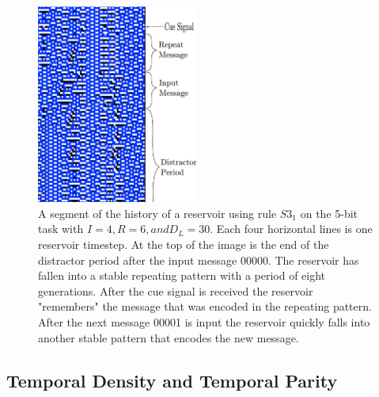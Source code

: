 \documentclass{elsarticle}
\begin{document}
\begin{multicols}{2}
\begin{figure}[H]
\centering
\includegraphics[width=0.475\textwidth]{RepeatMessage.pdf}
\caption{A segment of the history of a reservoir using rule $S3_{1}$ on the 
   5-bit task with $I=4, R=6, and D_{L}=30$. Each four horizontal lines is one 
      reservoir timestep. At the top of the image is the end of the distractor 
      period after the input message 00000. The reservoir has fallen into a 
      stable repeating pattern with a period of eight generations. After the 
      cue signal is received the reservoir "remembers" the message that was 
      encoded in the repeating pattern. After the next message 00001 is input 
      the reservoir quickly falls into another stable pattern that encodes the 
      new message.} 
        
\label{repeat}
\end{figure}

\subsection{Temporal Density and Temporal Parity}

\iffalse


\end{multicols}
\end{document}

